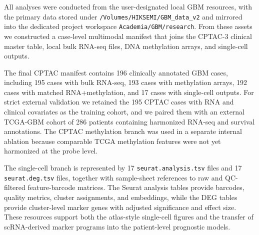 All analyses were conducted from the user-designated local GBM resources, with the primary data stored under \texttt{/Volumes/HIKSEMI/GBM\_data\_v2} and mirrored into the dedicated project workspace \texttt{Academia/GBM/research}. From these assets we constructed a case-level multimodal manifest that joins the CPTAC-3 clinical master table, local bulk RNA-seq files, DNA methylation arrays, and single-cell outputs.

The final CPTAC manifest contains 196 clinically annotated GBM cases, including 195 cases with bulk RNA-seq, 193 cases with methylation arrays, 192 cases with matched RNA+methylation, and 17 cases with single-cell outputs. For strict external validation we retained the 195 CPTAC cases with RNA and clinical covariates as the training cohort, and we paired them with an external TCGA-GBM cohort of 286 patients containing harmonized RNA-seq and survival annotations. The CPTAC methylation branch was used in a separate internal ablation because comparable TCGA methylation features were not yet harmonized at the probe level.

The single-cell branch is represented by 17 \texttt{seurat.analysis.tsv} files and 17 \texttt{seurat.deg.tsv} files, together with sample-sheet references to raw and QC-filtered feature-barcode matrices. The Seurat analysis tables provide barcodes, quality metrics, cluster assignments, and embeddings, while the DEG tables provide cluster-level marker genes with adjusted significance and effect size. These resources support both the atlas-style single-cell figures and the transfer of scRNA-derived marker programs into the patient-level prognostic models.
